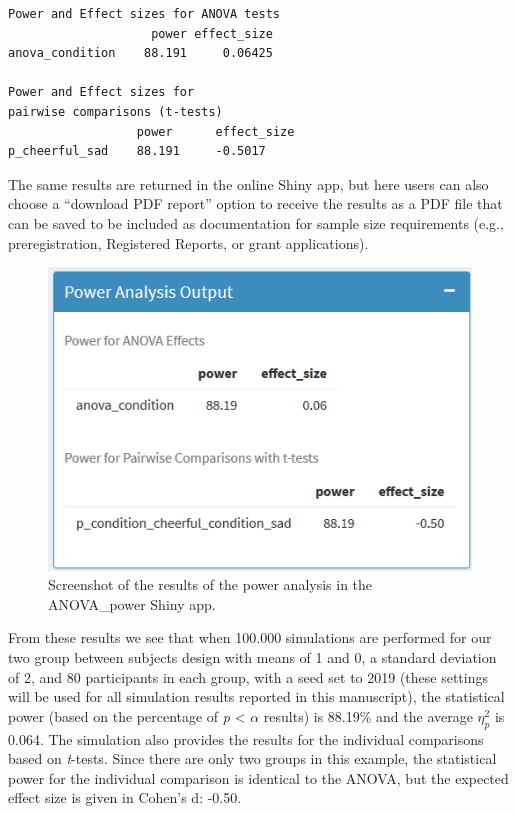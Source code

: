 \documentclass[
  ,jou,floatsintext]{apa6}
\begin{document}
\begin{verbatim}
Power and Effect sizes for ANOVA tests
                    power effect_size
anova_condition    88.191     0.06425

Power and Effect sizes for 
pairwise comparisons (t-tests)
                  power      effect_size
p_cheerful_sad    88.191     -0.5017
\end{verbatim}

The same results are returned in the online Shiny app, but here users can also choose a \enquote{download PDF report} option to receive the results as a PDF file that can be saved to be included as documentation for sample size requirements (e.g., preregistration, Registered Reports, or grant applications).

\begin{figure}
\centering
\includegraphics{screenshots/anova_power_result.png}
\caption{Screenshot of the results of the power analysis in the ANOVA\_power Shiny app.}
\end{figure}

From these results we see that when 100.000 simulations are performed for our two group between subjects design with means of 1 and 0, a standard deviation of 2, and 80 participants in each group, with a seed set to 2019 (these settings will be used for all simulation results reported in this manuscript), the statistical power (based on the percentage of \emph{p} \textless{} \(\alpha\) results) is 88.19\% and the average \(\eta_p^2\) is 0.064.
The simulation also provides the results for the individual comparisons based on \emph{t}-tests.
Since there are only two groups in this example, the statistical power for the individual comparison is identical to the ANOVA, but the expected effect size is given in Cohen's d: -0.50.
\end{document}
